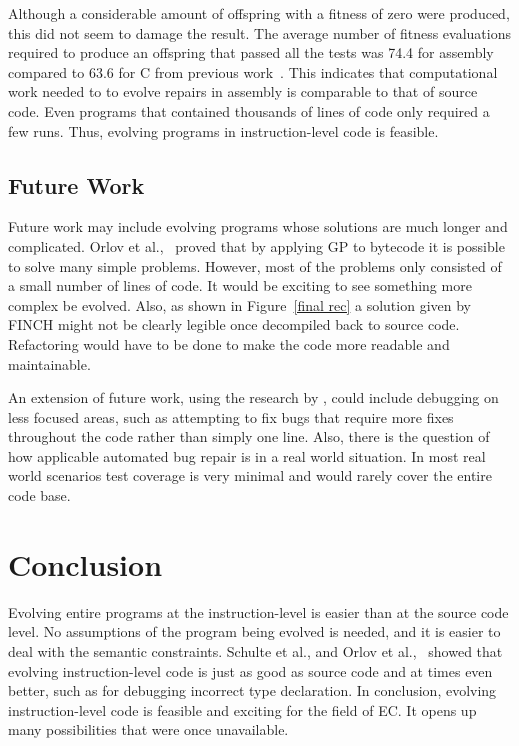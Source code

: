 \documentclass{sig-alternate}
\begin{document}
Although a considerable amount of offspring with a fitness of zero were produced, this did not seem to damage the result. The average number of fitness evaluations required to produce an offspring that passed all the tests was 74.4 for assembly compared to 63.6 for C from previous work~\cite{Forrest:2009}. This indicates that computational work needed to to evolve repairs in assembly is comparable to that of source code. Even programs that contained thousands of lines of code only required a few runs. Thus, evolving programs in instruction-level code is feasible.
 

\subsection{Future Work}


Future work may include evolving programs whose solutions are much longer and complicated. Orlov et al.,~\cite{FINCH:2011} proved that by applying GP to bytecode it is possible to solve many simple problems. However, most of the problems only consisted of a small number of lines of code. It would be exciting to see something more complex be evolved. Also, as shown in Figure~\ref{final rec} a solution given by FINCH might not be clearly legible once decompiled back to source code. Refactoring would have to be done to make the code more readable and maintainable.

An extension of future work, using the research by \cite{Assembly:2010}, could include debugging on less focused areas, such as attempting to fix bugs that require more fixes throughout the code rather than simply one line. Also, there is the question of how applicable automated bug repair is in a real world situation. In most real world scenarios test coverage is very minimal and would rarely cover the entire code base.


\section{Conclusion}
Evolving entire programs at the instruction-level is easier than at the source code level. No assumptions of the program being evolved is needed, and it is easier to deal with the semantic constraints. Schulte et al., and Orlov et al.,~\cite{Assembly:2010, FINCH:2011} showed that evolving instruction-level code is just as good as source code and at times even better, such as for debugging incorrect type declaration. In conclusion, evolving instruction-level code is feasible and exciting for the field of EC. It opens up many possibilities that were once unavailable.
\end{document}
